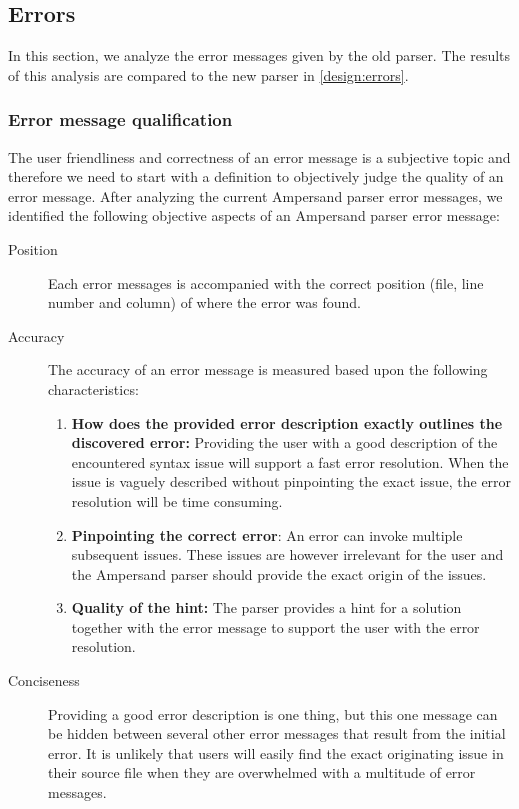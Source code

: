 
\subsection{Errors}
\label{analysis:errors}
In this section, we analyze the error messages given by the old parser.
The results of this analysis are compared to the new parser in \autoref{design:errors}.

\subsubsection{Error message qualification}
The user friendliness and correctness of an error message is a subjective topic and therefore we need to start with a definition to objectively judge the quality of an error message.
After analyzing the current Ampersand parser error messages, we identified the following objective aspects of an Ampersand parser error message:
%
\begin{description}
	\item [Position]
	Each error messages is accompanied with the correct position (file, line number and column) of where the error was found.
	\item [Accuracy]
	The accuracy of an error message is measured based upon the following characteristics:
	\begin{enumerate}
		\item	\textbf{\small How does the provided error description exactly outlines the discovered error:}
				Providing the user with a good description of the encountered syntax issue will support a fast error resolution.
				When the issue is vaguely described without pinpointing the exact issue, the error resolution will be time consuming.
		\item	\textbf{\small Pinpointing the correct error}:
				An error can invoke multiple subsequent issues. 
				These issues are however irrelevant for the user and the Ampersand parser should provide the exact origin of the issues.
		\item	\textbf{\small Quality of the hint:}
			The parser provides a hint for a solution together with the error message to support the user with the error resolution.
	\end {enumerate}
    \item[Conciseness]
	Providing a good error description is one thing, but this one message can be hidden between several other error messages that result from the initial error.
	It is unlikely that users will easily find the exact originating issue in their source file when they are overwhelmed with a multitude of error messages. %
\end {description}
